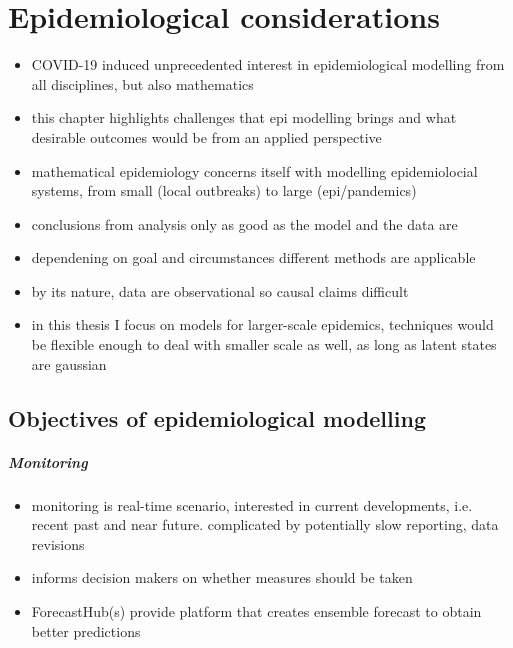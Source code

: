 \chapter{Epidemiological considerations}
\label{chap:epidemiological_considerations}

\begin{itemize}
    \item COVID-19 induced unprecedented interest in epidemiological modelling from all disciplines, but also mathematics
    \item this chapter highlights challenges that epi modelling brings and what desirable outcomes would be from an applied perspective
    \item mathematical epidemiology concerns itself with modelling epidemiolocial systems, from small (local outbreaks) to large (epi/pandemics)
    \item conclusions from analysis only as good as the model and the data are
    \item dependening on goal and circumstances different methods are applicable
    \item by its nature, data are observational so causal claims difficult
    \item in this thesis I focus on models for larger-scale epidemics, techniques would be flexible enough to deal with smaller scale as well, as long as latent states are gaussian
\end{itemize}
\section{Objectives of epidemiological modelling}

\paragraph{Monitoring}
\begin{itemize}
    \item monitoring is real-time scenario, interested in current developments, i.e. recent past and near future. complicated by potentially slow reporting, data revisions
    \item informs decision makers on whether measures should be taken
    \item ForecastHub(s) provide platform that creates ensemble forecast to obtain better predictions \cite{Bracher2022National,Bracher2021Preregistered,Ray2020Ensemble,Sherratt2022Predictive}
\end{itemize}
